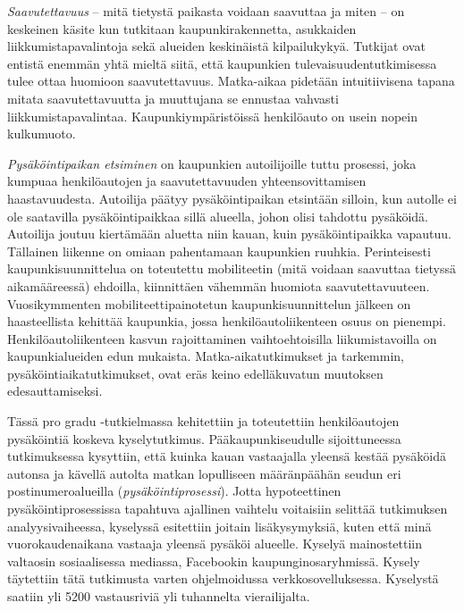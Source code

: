 \justify
\textit{Saavutettavuus} -- mitä tietystä paikasta voidaan saavuttaa ja miten -- on keskeinen käsite kun tutkitaan kaupunkirakennetta, asukkaiden liikkumistapavalintoja sekä alueiden keskinäistä kilpailukykyä. Tutkijat ovat entistä enemmän yhtä mieltä siitä, että kaupunkien tulevaisuudentutkimisessa tulee ottaa huomioon saavutettavuus. Matka-aikaa pidetään intuitiivisena tapana mitata saavutettavuutta ja muuttujana se ennustaa vahvasti liikkumistapavalintaa. Kaupunkiympäristöissä henkilöauto on usein nopein kulkumuoto.

\textit{Pysäköintipaikan etsiminen} on kaupunkien autoilijoille tuttu prosessi, joka kumpuaa henkilöautojen ja saavutettavuuden yhteensovittamisen haastavuudesta. Autoilija päätyy pysäköintipaikan etsintään silloin, kun autolle ei ole saatavilla pysäköintipaikkaa sillä alueella, johon olisi tahdottu pysäköidä. Autoilija joutuu kiertämään aluetta niin kauan, kuin pysäköintipaikka vapautuu. Tällainen liikenne on omiaan pahentamaan kaupunkien ruuhkia. Perinteisesti kaupunkisuunnittelua on toteutettu mobiliteetin (mitä voidaan saavuttaa tietyssä aikamääreessä) ehdoilla, kiinnittäen vähemmän huomiota saavutettavuuteen. Vuosikymmenten mobiliteettipainotetun kaupunkisuunnittelun jälkeen on haasteellista kehittää kaupunkia, jossa henkilöautoliikenteen osuus on pienempi. Henkilöautoliikenteen kasvun rajoittaminen vaihtoehtoisilla liikumistavoilla on kaupunkialueiden edun mukaista. Matka-aikatutkimukset ja tarkemmin, pysäköintiaikatutkimukset, ovat eräs keino edelläkuvatun muutoksen edesauttamiseksi.

Tässä pro gradu -tutkielmassa kehitettiin ja toteutettiin henkilöautojen pysäköintiä koskeva kyselytutkimus. Pääkaupunkiseudulle sijoittuneessa tutkimuksessa kysyttiin, että kuinka kauan vastaajalla yleensä kestää pysäköidä autonsa ja kävellä autolta matkan lopulliseen määränpäähän seudun eri postinumeroalueilla (\textit{pysäköintiprosessi}). Jotta hypoteettinen pysäköintiprosessissa tapahtuva ajallinen vaihtelu voitaisiin selittää tutkimuksen analyysivaiheessa, kyselyssä esitettiin joitain lisäkysymyksiä, kuten että minä vuorokaudenaikana vastaaja yleensä pysäköi alueelle. Kyselyä mainostettiin valtaosin sosiaalisessa mediassa, Facebookin kaupunginosaryhmissä. Kysely täytettiin tätä tutkimusta varten ohjelmoidussa verkkosovelluksessa. Kyselystä saatiin yli 5200 vastausriviä yli tuhannelta vierailijalta.

